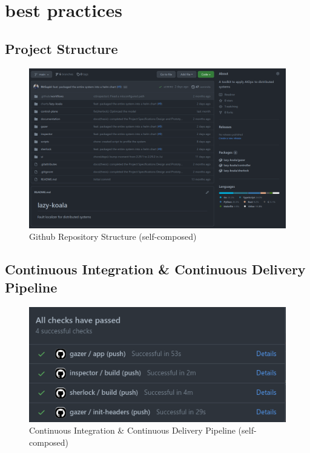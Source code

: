 \chapter{best practices}\label{appendix:github}


\section{Project Structure}

\begin{figure}[H]
    \includegraphics[width=16.5cm]{assets/appendix/github.png}
    \caption{Github Repository Structure (self-composed)}
\end{figure}

\section{Continuous Integration \& Continuous Delivery Pipeline}

\begin{figure}[H]
    \includegraphics[width=16.5cm]{assets/appendix/ci.png}
    \caption{Continuous Integration \& Continuous Delivery Pipeline (self-composed)}
\end{figure}

